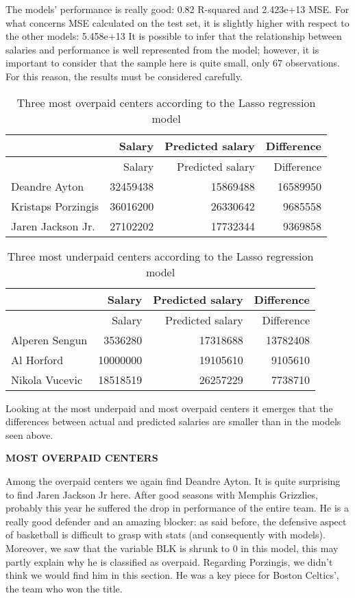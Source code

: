 \documentclass[
]{article}
\begin{document}
The models' performance is really good: 0.82 R-squared and 2.423e+13
MSE. For what concerns MSE calculated on the test set, it is slightly
higher with respect to the other models: 5.458e+13 It is possible to
infer that the relationship between salaries and performance is well
represented from the model; however, it is important to consider that
the sample here is quite small, only 67 observations. For this reason,
the results must be considered carefully.

\begin{longtable}[]{@{}lrrr@{}}
\caption{Three most overpaid centers according to the Lasso regression
model}\tabularnewline
\toprule()
& Salary & Predicted salary & Difference \\
\midrule()
\endfirsthead
\toprule()
& Salary & Predicted salary & Difference \\
\midrule()
\endhead
Deandre Ayton & 32459438 & 15869488 & 16589950 \\
Kristaps Porzingis & 36016200 & 26330642 & 9685558 \\
Jaren Jackson Jr. & 27102202 & 17732344 & 9369858 \\
\bottomrule()
\end{longtable}

\begin{longtable}[]{@{}lrrr@{}}
\caption{Three most underpaid centers according to the Lasso regression
model}\tabularnewline
\toprule()
& Salary & Predicted salary & Difference \\
\midrule()
\endfirsthead
\toprule()
& Salary & Predicted salary & Difference \\
\midrule()
\endhead
Alperen Sengun & 3536280 & 17318688 & 13782408 \\
Al Horford & 10000000 & 19105610 & 9105610 \\
Nikola Vucevic & 18518519 & 26257229 & 7738710 \\
\bottomrule()
\end{longtable}

Looking at the most underpaid and most overpaid centers it emerges that
the differences between actual and predicted salaries are smaller than
in the models seen above.

\textbf{MOST OVERPAID CENTERS}

Among the overpaid centers we again find Deandre Ayton. It is quite
surprising to find Jaren Jackson Jr here. After good seasons with
Memphis Grizzlies, probably this year he suffered the drop in
performance of the entire team. He is a really good defender and an
amazing blocker: as said before, the defensive aspect of basketball is
difficult to grasp with stats (and consequently with models). Moreover,
we saw that the variable BLK is shrunk to 0 in this model, this may
partly explain why he is classified as overpaid. Regarding Porzingis, we
didn't think we would find him in this section. He was a key piece for
Boston Celtics', the team who won the title.
\end{document}
